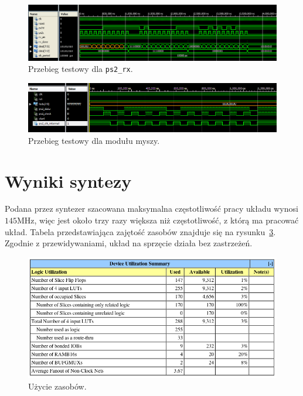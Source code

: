 \newpage
\begin{landscape}
\begin{figure}[h!]
\begin{center}
\includegraphics[scale=.6]{rx_test.png}
\caption{Przebieg testowy dla \texttt{ps2\_rx}.}
\label{fig:rx_test}
\end{center}
\end{figure}

\begin{figure}[h!]
\begin{center}
\includegraphics[scale=.85]{mouse_test.png}
\caption{Przebieg testowy dla modułu myszy.}
\label{fig:mouse_test}
\end{center}
\end{figure}
\end{landscape}
\newpage

\section{Wyniki syntezy}
\label{sec:synteza}

Podana przez syntezer szacowana maksymalna częstotliwość pracy układu wynosi
$145$MHz, więc jest około trzy razy większa niż częstotliwość, z którą ma
pracować układ. Tabela przedstawiająca zajętość zasobów znajduje się na
rysunku~\ref{fig:usage}. Zgodnie z przewidywaniami, układ na sprzęcie działa bez
zastrzeżeń.

\begin{figure}[h!]
\begin{center}
\includegraphics[scale=.6]{usage.png}
\caption{Użycie zasobów.}
\label{fig:usage}
\end{center}
\end{figure}


